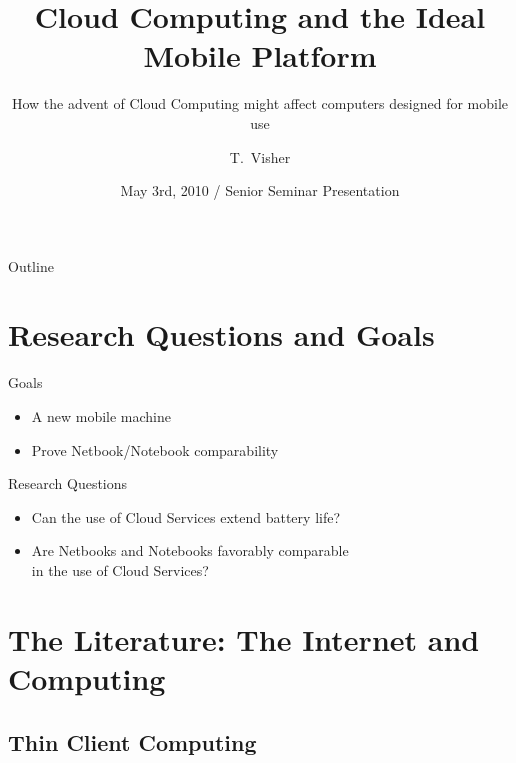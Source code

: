 \documentclass{beamer}
\title{Cloud Computing and the Ideal Mobile Platform}
\subtitle{How the advent of Cloud Computing might affect computers designed for
  mobile use}
\author{T.~Visher}
\institute[Chestnut Hill College]{Department of Computer Science\\
  Chestnut Hill College}
\date[Senior Seminar]{May 3rd, 2010 / Senior Seminar Presentation}
\begin{document}
\begin{frame}
\titlepage
\end{frame}

\begin{frame}{Outline}
\tableofcontents[pausesections]
\end{frame}



\section[Introduction]{Research Questions and Goals}

\begin{frame}{Goals}

\begin{itemize}
  \item A new mobile machine
  \item Prove Netbook/Notebook comparability
\end{itemize}

\end{frame}

\begin{frame}{Research Questions}
  \begin{itemize}
  \item Can the use of Cloud Services extend battery life?
  \item Are Netbooks and Notebooks favorably comparable \\ in the use of Cloud
    Services?
  \end{itemize}
\end{frame}

\section[Literature Review]{The Literature: The Internet and Computing}

\subsection{Thin Client Computing}
\end{document}
